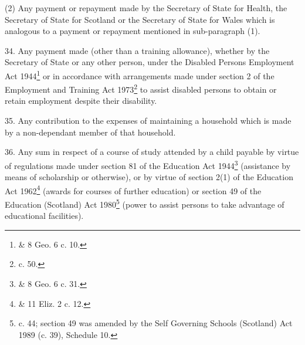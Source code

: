 \documentclass[12pt,a4paper]{article}
\begin{document}
(2) Any payment or repayment made by the Secretary of State for Health, the Secretary of State for Scotland or the Secretary of State for Wales which is analogous to a payment or repayment mentioned in sub-paragraph (1).

\medskip

34.  Any payment made (other than a training allowance), whether by the Secretary of State or any other person, under the Disabled Persons Employment Act 1944\footnote{ \& 8 Geo. 6 c. 10.} or in accordance with arrangements made under section 2 of the Employment and Training Act 1973\footnote{ c. 50.} to assist disabled persons to obtain or retain employment despite their disability.

\medskip

35.  Any contribution to the expenses of maintaining a household which is made by a non-dependant member of that household.

\medskip

36.  Any sum in respect of a course of study attended by a child payable by virtue of regulations made under section 81 of the Education Act 1944\footnote{ \& 8 Geo. 6 c. 31.} (assistance by means of scholarship or otherwise), or by virtue of section 2(1) of the Education Act 1962\footnote{ \& 11 Eliz. 2 c. 12.} (awards for courses of further education) or section 49 of the Education (Scotland) Act 1980\footnote{ c. 44; section 49 was amended by the Self Governing Schools (Scotland) Act 1989 (c. 39), Schedule 10.} (power to assist persons to take advantage of educational facilities).

\medskip
\end{document}
